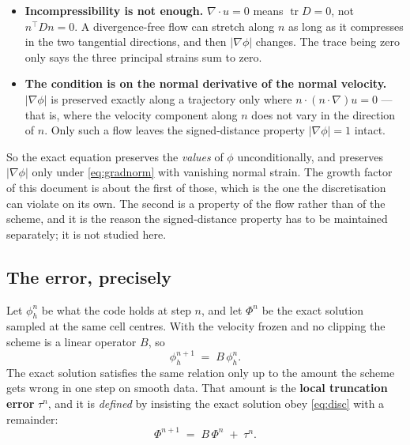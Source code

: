 \documentclass[11pt,a4paper]{article}
\begin{document}
\begin{itemize}
\item \textbf{Incompressibility is not enough.} \(\nabla\cdot u = 0\) means
      \(\operatorname{tr} D = 0\), not \(n^{\!\top}Dn = 0\). A divergence-free flow can stretch
      along \(n\) as long as it compresses in the two tangential directions, and then
      \(|\nabla\phi|\) changes. The trace being zero only says the three principal strains sum
      to zero.
\item \textbf{The condition is on the normal derivative of the normal velocity.}
      \(|\nabla\phi|\) is preserved exactly along a trajectory only where
      \(n\cdot(n\cdot\nabla)u = 0\) --- that is, where the velocity component along \(n\) does
      not vary in the direction of \(n\). Only such a flow leaves the signed-distance property
      \(|\nabla\phi| = 1\) intact.
\end{itemize}

So the exact equation preserves the \emph{values} of \(\phi\) unconditionally, and preserves
\(|\nabla\phi|\) only under \eqref{eq:gradnorm} with vanishing normal strain. The growth factor
of this document is about the first of those, which is the one the discretisation can violate on
its own. The second is a property of the flow rather than of the scheme, and it is the reason
the signed-distance property has to be maintained separately; it is not studied here.

\subsection{The error, precisely}

Let \(\phi_h^n\) be what the code holds at step \(n\), and let \(\Phi^n\) be the exact solution
sampled at the same cell centres. With the velocity frozen and no clipping the scheme is a
linear operator \(B\), so
\begin{equation}
  \phi_h^{n+1} \;=\; B\,\phi_h^{n}.
  \label{eq:disc}
\end{equation}
The exact solution satisfies the same relation only up to the amount the scheme gets wrong in
one step on smooth data. That amount is the \textbf{local truncation error} \(\tau^n\), and it
is \emph{defined} by insisting the exact solution obey \eqref{eq:disc} with a remainder:
\begin{equation}
  \Phi^{n+1} \;=\; B\,\Phi^{n} \;+\; \tau^{n}.
  \label{eq:exactstep}
\end{equation}
\end{document}
